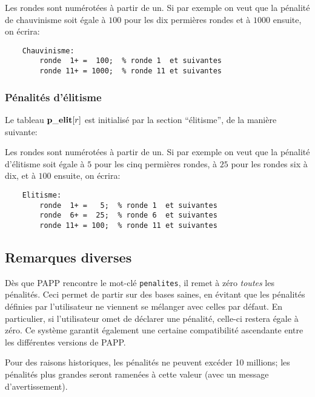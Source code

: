 \documentclass[10pt]{article}
\begin{document}
Les rondes sont num\'erot\'ees \`a partir de un. Si par exemple on veut
que la p\'enalit\'e de chauvinisme soit \'egale \`a $100$ pour les dix
permi\`eres rondes et \`a $1000$ ensuite, on \'ecrira:
\begin{verbatim}
    Chauvinisme:
        ronde  1+ =  100;  % ronde 1  et suivantes
        ronde 11+ = 1000;  % ronde 11 et suivantes
\end{verbatim}

\subsubsection{P\'enalit\'es d'\'elitisme}

Le tableau ${\bf p\_elit}[r]$ est initialis\'e par la section
``\'elitisme'', de la mani\`ere suivante:

\medbreak
{}
\medbreak


Les rondes sont num\'erot\'ees \`a partir de un.  Si par exemple on 
veut que la p\'enalit\'e d'\'elitisme soit \'egale \`a $5$ pour les 
cinq permi\`eres rondes, \`a $25$ pour les rondes six \`a dix, et \`a 
$100$ ensuite, on \'ecrira:
\begin{verbatim}
    Elitisme:
        ronde  1+ =   5;  % ronde 1  et suivantes
        ronde  6+ =  25;  % ronde 6  et suivantes
        ronde 11+ = 100;  % ronde 11 et suivantes
\end{verbatim}

\subsection{Remarques diverses}

	D\`es que PAPP rencontre le mot-cl\'e \verb|penalites|, il remet
\`a z\'ero {\em toutes\/} les p\'enalit\'es. Ceci permet de partir sur
des bases saines, en \'evitant que les p\'enalit\'es d\'efinies par
l'utilisateur ne viennent se m\'elanger avec celles par d\'efaut. En
particulier, si l'utilisateur omet de d\'eclarer une p\'enalit\'e,
celle-ci restera \'egale \`a z\'ero. Ce syst\`eme garantit \'egalement une
certaine compatibilit\'e ascendante entre les diff\'erentes versions de
PAPP.

	Pour des raisons historiques, les p\'enalit\'es ne peuvent
exc\'eder 10 millions; les p\'enalit\'es plus grandes seront ramen\'ees
\`a cette valeur (avec un message d'avertissement).
\end{document}
